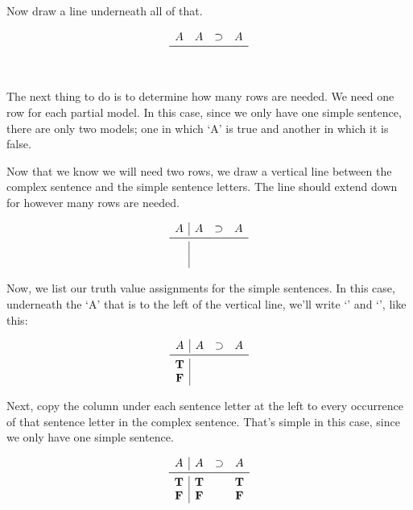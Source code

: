 \documentclass[../logic-text.tex]{subfiles}
\begin{document}
Now draw a line underneath all of that.

\[
  \begin{array}{cccc}
    A & A & \lif & A \\ \midrule
    \phantom{A}&&&\\
    \phantom{A}&&&\\
  \end{array}
\]





The next thing to do is to determine how many rows are needed.
We need one row for each partial model.
In this case, since we only have one simple sentence, there are only two models; one in which \enquote*{A} is true and another in which it is false.

Now that we know we will need two rows, we draw a vertical line between the complex sentence and the simple sentence letters.
The line should extend down for however many rows are needed.

\[
  \begin{array}{c|ccc}
    A & A & \lif & A \\ \midrule
    \phantom{A}&&&\\
    \phantom{A}&&&\\
  \end{array}
\]

Now, we list our truth value assignments for the simple sentences.
In this case, underneath the \enquote*{A}  that is to the left of the vertical line, we'll write \enquote*{\true } and \enquote*{\false}, like  this:

\[
  \begin{array}{c|ccc}
    A & A & \lif & A \\ \midrule
    \true&&&\\
    \false&&&\\
  \end{array}
\]

Next, copy the column under each sentence letter at the left to every occurrence of that sentence letter in the complex sentence.
That's simple in this case, since we only have one simple sentence.

\[
  \begin{array}{c|ccc}
    A & A & \lif & A \\ \midrule
    \true & \true & & \true\\
    \false & \false & & \false\\
  \end{array}
\]
\end{document}
